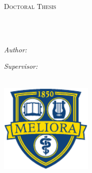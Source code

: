 \documentclass[
11pt, %
english, %
doublespacing, %
nolistspacing, %
headsepline, %
]{MastersDoctoralThesis} %
\author{Hayden \textsc{Scott}} %
\begin{document}
\frontmatter %

\pagestyle{plain} %


\begin{titlepage}
	\begin{singlespace}
\begin{center}

\vspace*{.02\textheight}
{\scshape\LARGE \univname\par}\vspace{1.5cm} %
\textsc{\Large Doctoral Thesis}\\[0.5cm] %

\HRule \\[0.4cm] %
{\huge \bfseries \ttitle\par}\vspace{0.4cm} %
\HRule \\[1.5cm] %
 
\begin{minipage}[t]{0.4\textwidth}
\begin{flushleft} \large
\emph{Author:}\\
\href{http://www.hscott5.github.io}{\authorname} %
\end{flushleft}
\end{minipage}
\begin{minipage}[t]{0.4\textwidth}
\begin{flushright} \large
\emph{Supervisor:} \\
\href{https://adams-lab.weebly.com/}{\supname} %
\end{flushright}
\end{minipage}\\[1.5cm]
 
\includegraphics[width=45mm]{URlogo.pdf} %
 

\end{center}
\end{singlespace}
\end{titlepage}
\end{document}
